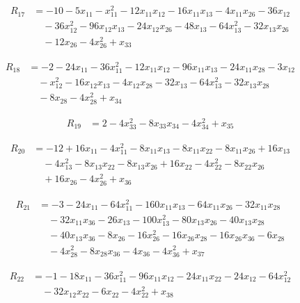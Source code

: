 \begin{align*}
R_{17} &= -10 -5 x_{11} -x_{11}^{2} -12 x_{11} x_{12} -16 x_{11} x_{13} -4 x_{11} x_{26} -36 x_{12} \\
&\quad -36 x_{12}^{2} -96 x_{12} x_{13} -24 x_{12} x_{26} -48 x_{13} -64 x_{13}^{2} -32 x_{13} x_{26} \\
&\quad -12 x_{26} -4 x_{26}^{2} +x_{33}
\end{align*}

\begin{align*}
R_{18} &= -2 -24 x_{11} -36 x_{11}^{2} -12 x_{11} x_{12} -96 x_{11} x_{13} -24 x_{11} x_{28} -3 x_{12} \\
&\quad -x_{12}^{2} -16 x_{12} x_{13} -4 x_{12} x_{28} -32 x_{13} -64 x_{13}^{2} -32 x_{13} x_{28} \\
&\quad -8 x_{28} -4 x_{28}^{2} +x_{34}
\end{align*}

\begin{align*}
R_{19} &= 2 -4 x_{33}^{2} -8 x_{33} x_{34} -4 x_{34}^{2} +x_{35}
\end{align*}

\begin{align*}
R_{20} &= -12 +16 x_{11} -4 x_{11}^{2} -8 x_{11} x_{13} -8 x_{11} x_{22} -8 x_{11} x_{26} +16 x_{13} \\
&\quad -4 x_{13}^{2} -8 x_{13} x_{22} -8 x_{13} x_{26} +16 x_{22} -4 x_{22}^{2} -8 x_{22} x_{26} \\
&\quad +16 x_{26} -4 x_{26}^{2} +x_{36}
\end{align*}

\begin{align*}
R_{21} &= -3 -24 x_{11} -64 x_{11}^{2} -160 x_{11} x_{13} -64 x_{11} x_{26} -32 x_{11} x_{28} \\
&\quad -32 x_{11} x_{36} -26 x_{13} -100 x_{13}^{2} -80 x_{13} x_{26} -40 x_{13} x_{28} \\
&\quad -40 x_{13} x_{36} -8 x_{26} -16 x_{26}^{2} -16 x_{26} x_{28} -16 x_{26} x_{36} -6 x_{28} \\
&\quad -4 x_{28}^{2} -8 x_{28} x_{36} -4 x_{36} -4 x_{36}^{2} +x_{37}
\end{align*}

\begin{align*}
R_{22} &= -1 -18 x_{11} -36 x_{11}^{2} -96 x_{11} x_{12} -24 x_{11} x_{22} -24 x_{12} -64 x_{12}^{2} \\
&\quad -32 x_{12} x_{22} -6 x_{22} -4 x_{22}^{2} +x_{38}
\end{align*}

